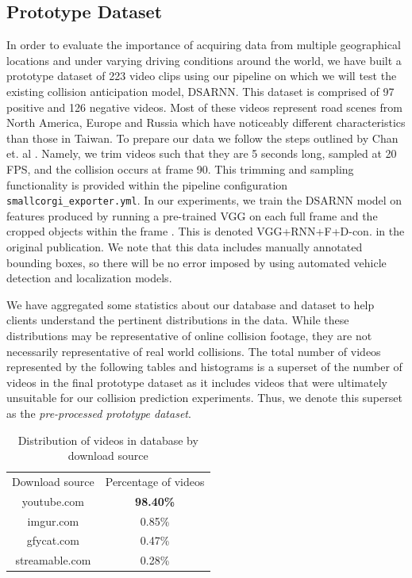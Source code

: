 \documentclass[letterpaper, 10 pt, conference]{ieeeconf}
\begin{document}
\subsection{Prototype Dataset}
\label{section-prototype-dataset}
In order to evaluate the importance of acquiring data from multiple geographical locations and under varying driving conditions around the world, we have built a prototype dataset of 223 video clips using our pipeline on which we will test the existing collision anticipation model, DSARNN. This dataset is comprised of 97 positive and 126 negative videos. Most of these videos represent road scenes from North America, Europe and Russia which have noticeably different characteristics than those in Taiwan. To prepare our data we follow the steps outlined by Chan et. al \cite{chan2016anticipating}. Namely, we trim videos such that they are 5 seconds long, sampled at 20 FPS, and the collision occurs at frame 90. This trimming and sampling functionality is provided within the pipeline configuration \texttt{smallcorgi\_exporter.yml}. In our experiments, we train the DSARNN model on features produced by running a pre-trained VGG on each full frame and the cropped objects within the frame \cite{DBLP:journals/corr/SimonyanZ14a}. This is denoted VGG+RNN+F+D-con. in the original publication. We note that this data includes manually annotated bounding boxes, so there will be no error imposed by using automated vehicle detection and localization models.

\byclass
{}\byactors
{}\byagents
{}\byduration

We have aggregated some statistics about our database and dataset to help clients understand the pertinent distributions in the data. While these distributions may be representative of online collision footage, they are not necessarily representative of real world collisions. The total number of videos represented by the following tables and histograms is a superset of the number of videos in the final prototype dataset as it includes videos that were ultimately unsuitable for our collision prediction experiments. Thus, we denote this superset as the \textit{pre-processed prototype dataset}.

\begin{table}[!h]
	\caption{Distribution of videos in database by download source}
	\label{vids-by-source}
	\begin{center}
		\begin{tabular}{|c|c|}
			\hline
			Download source & Percentage of videos \\
			youtube.com & \textbf{98.40\%} \\
			imgur.com & 0.85\% \\
			gfycat.com & 0.47\% \\
			streamable.com & 0.28\% \\
			\hline
		\end{tabular}
	\end{center}
\end{table}
\end{document}
